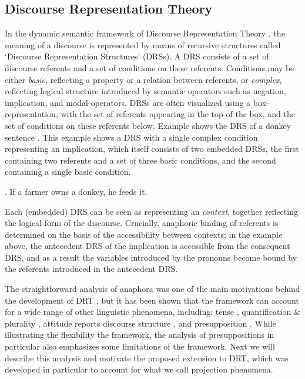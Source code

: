 \subsection{Discourse Representation Theory}

In the dynamic semantic framework of Discourse Representation Theory
, the meaning of a discourse is
represented by means of recursive structures called `Discourse
Representation Structures' (DRSs). A DRS consists of a set of discourse
referents and a set of conditions on these referents. Conditions may be
either \textit{basic}, reflecting a property or a relation between
referents, or \textit{complex}, reflecting logical structure introduced by
semantic operators such as negation, implication, and modal operators. DRSs
are often visualized using a box-representation, with the set of referents
appearing in the top of the box, and the set of conditions on these
referents below.  Example \Next shows the DRS of a donkey sentence
. This example shows a DRS
with a single complex condition representing an implication, which itself
consists of two embedded DRSs, the first containing two referents and a set
of three basic conditions, and the second containing a single basic
condition.

\ex. If a farmer owns a donkey, he feeds it.\\\hspace*{-0.2cm}

Each (embedded) DRS can be seen as representing an \textit{context},
together reflecting the logical form of the discourse. Crucially, anaphoric
binding of referents is determined on the basis of the accessibility between
contexts; in the example above, the antecedent DRS of the implication is
accessible from the consequent DRS, and as a result the variables introduced
by the pronouns become bound by the referents introduced in the antecedent
DRS. 

The straightforward analysis of anaphora was one of the main motivations
behind the development of DRT \cite{kamp1981theory,heim1982semantics}, but
it has been shown that the framework can account for a wide range of other
linguistic phenomena, including: tense \cite{kamp1981theory}, quantification
\& plurality \cite{kamp1993discourse}, attitude reports
\cite{asher1986belief,asher1989belief,zeevat1996neoclassical,maier2009presupposing}
discourse structure \cite{asher2003logics}, and presupposition
\cite{sandt1992presupposition,krahmer1998presupposition,geurts1999presuppositions}.
While illustrating the flexibility the framework, the analysis of
presuppositions in particular also emphasizes some limitations of the
framework. Next we will describe this analysis and motivate the proposed
extension to DRT, which was developed in particular to account for what we
call projection phenomena.

